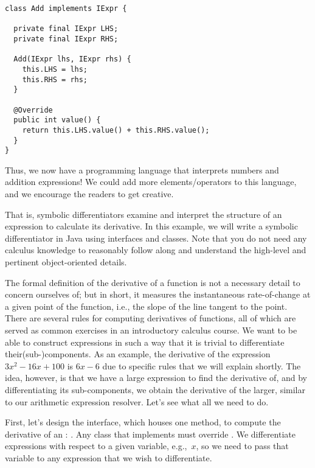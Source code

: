 \begin{lstlisting}[language=MyJava]
class Add implements IExpr {

  private final IExpr LHS;
  private final IExpr RHS;

  Add(IExpr lhs, IExpr rhs) {
    this.LHS = lhs;
    this.RHS = rhs;
  }

  @Override
  public int value() { 
    return this.LHS.value() + this.RHS.value(); 
  }
}
\end{lstlisting}
Thus, we now have a programming language that interprets numbers and addition expressions! 
We could add more elements/operators to this language, and we encourage the readers to get creative.

That is, symbolic differentiators examine and interpret the structure of an expression to calculate its derivative. 
In this example, we will write a symbolic differentiator in Java using interfaces and classes. Note that you do not need any calculus knowledge to reasonably follow along and understand the high-level and pertinent object-oriented details.

The formal definition of the derivative of a function is not a necessary detail to concern ourselves of; but in short, it measures the instantaneous rate-of-change at a given point of the function, i.e., the slope of the line tangent to the point. 
There are several rules for computing derivatives of functions, all of which are served as common exercises in an introductory calculus course. 
We want to be able to construct expressions in such a way that it is trivial to differentiate their(sub-)components. 
As an example, the derivative of the expression $3x^2 - 16x + 100$ is $6x - 6$ due to specific rules that we will explain shortly. 
The idea, however, is that we have a large expression to find the derivative of, and by differentiating its sub-components, we obtain the derivative of the larger, similar to our arithmetic expression resolver. 
Let's see what all we need to do.

First, let's design the  interface, which houses one method, to compute the derivative of an : . Any class that implements  must override . 
We differentiate expressions with respect to a given variable, e.g.,~$x$, so we need to pass that variable to any expression that we wish to differentiate. 


